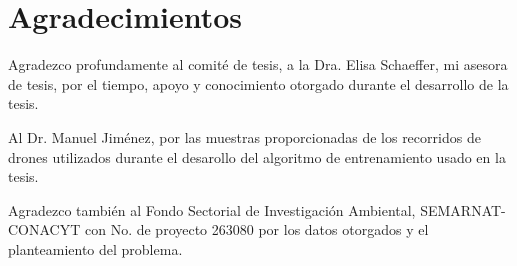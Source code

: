 
\chapter{Agradecimientos}

Agradezco profundamente al comité de tesis, a la Dra. Elisa Schaeffer, mi asesora de tesis, por el tiempo, apoyo y conocimiento otorgado durante el desarrollo de la tesis.

Al Dr. Manuel Jiménez, por las muestras proporcionadas de los recorridos de drones utilizados durante el desarollo del algoritmo de entrenamiento usado en la tesis.

Agradezco también al Fondo Sectorial de Investigación Ambiental, SEMARNAT-CONACYT con No. de proyecto 263080  por los datos otorgados y el planteamiento del problema.